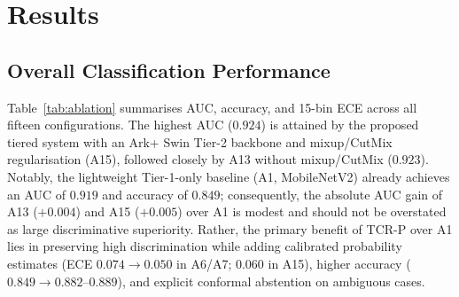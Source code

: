 \documentclass[diagnostics,article,submit,moreauthors]{Definitions/mdpi}
\newcommand{\rev}[1]{#1}
\begin{document}
\section{Results}
\label{sec:results}

\subsection{Overall Classification Performance}

Table~\ref{tab:ablation} summarises AUC, accuracy, and 15-bin ECE across all fifteen configurations. The highest AUC ($0.924$) is attained by the proposed tiered system with an Ark+ Swin Tier-2 backbone and mixup/CutMix regularisation (A15), followed closely by A13 without mixup/CutMix ($0.923$). \rev{Notably, the lightweight Tier-1-only baseline (A1, MobileNetV2) already achieves an AUC of $0.919$ and accuracy of $0.849$; consequently, the absolute AUC gain of A13 ($+0.004$) and A15 ($+0.005$) over A1 is modest and should not be overstated as large discriminative superiority. Rather, the primary benefit of TCR-P over A1 lies in preserving high discrimination while adding calibrated probability estimates (ECE $0.074 \to 0.050$ in A6/A7; $0.060$ in A15), higher accuracy ($0.849 \to 0.882$--$0.889$), and explicit conformal abstention on ambiguous cases.}
\end{document}

